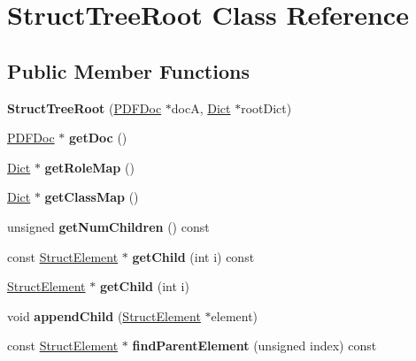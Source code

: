 \hypertarget{class_struct_tree_root}{}\section{Struct\+Tree\+Root Class Reference}
\label{class_struct_tree_root}
\subsection*{Public Member Functions}
\begin{DoxyCompactItemize}
\item 
\mbox{\label{class_struct_tree_root_a592e3bf0b8a91de5fa1cc7bf3a4ac0c5}} 
{\bfseries Struct\+Tree\+Root} (\hyperlink{class_p_d_f_doc}{P\+D\+F\+Doc} $\ast$docA, \hyperlink{class_dict}{Dict} $\ast$root\+Dict)
\item 
\mbox{\label{class_struct_tree_root_afc01f8e002fd907c09d41eebe4694b22}} 
\hyperlink{class_p_d_f_doc}{P\+D\+F\+Doc} $\ast$ {\bfseries get\+Doc} ()
\item 
\mbox{\label{class_struct_tree_root_afc3816d745681920baed9b1c01a21efd}} 
\hyperlink{class_dict}{Dict} $\ast$ {\bfseries get\+Role\+Map} ()
\item 
\mbox{\label{class_struct_tree_root_a71e3f36854073a73010b5028cd20d6f6}} 
\hyperlink{class_dict}{Dict} $\ast$ {\bfseries get\+Class\+Map} ()
\item 
\mbox{\label{class_struct_tree_root_a9505fb1143f53c0c33b4ec3667223dc5}} 
unsigned {\bfseries get\+Num\+Children} () const
\item 
\mbox{\label{class_struct_tree_root_ae3d8c2a6a6f098dc96df8fd523650eea}} 
const \hyperlink{class_struct_element}{Struct\+Element} $\ast$ {\bfseries get\+Child} (int i) const
\item 
\mbox{\label{class_struct_tree_root_ab886a8e95f79f28a52fe5a59e2ee2c3c}} 
\hyperlink{class_struct_element}{Struct\+Element} $\ast$ {\bfseries get\+Child} (int i)
\item 
\mbox{\label{class_struct_tree_root_a21f2ffa7971ad7cb58d4f930664fcede}} 
void {\bfseries append\+Child} (\hyperlink{class_struct_element}{Struct\+Element} $\ast$element)
\item 
\mbox{\label{class_struct_tree_root_a1cefa85ebdb9e7544114b1cf77bd078c}} 
const \hyperlink{class_struct_element}{Struct\+Element} $\ast$ {\bfseries find\+Parent\+Element} (unsigned index) const
\end{DoxyCompactItemize}
